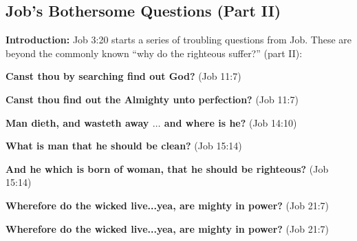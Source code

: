 \subsection{Job's Bothersome Questions (Part II)}
\textbf{Introduction:} Job 3:20 starts a series of troubling questions from Job. These are beyond the commonly known ``why do the righteous suffer?'' (part II):%
\begin{compactenum}[I.][19]
    \item  \textbf{Canst thou by searching find out God?} (Job 11:7)
    \item  \textbf{Canst thou find out the Almighty unto perfection?} (Job 11:7)
    \item  \textbf{Man dieth, and wasteth away $\hdots$ and where is he?} (Job 14:10)
    \item  \textbf{What is man that he should be clean?} (Job 15:14)
    \item  \textbf{And he which is born of woman, that he should be righteous?} (Job 15:14)
    \item  \textbf{Wherefore do the wicked live...yea, are mighty in power?} (Job 21:7)
    \item  \textbf{Wherefore do the wicked live...yea, are mighty in power?} (Job 21:7)
\end{compactenum}

